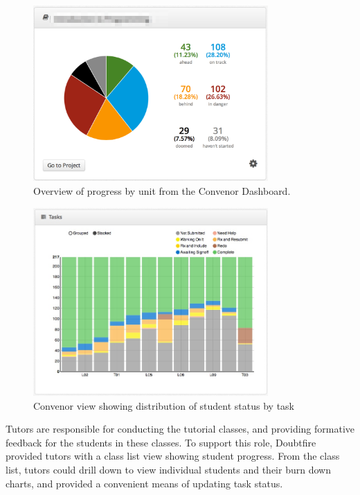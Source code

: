 \begin{figure}[thbp]
  \centering
  \includegraphics[width=0.8\textwidth]{Dashboard}%
  \caption{Overview of progress by unit from the Convenor Dashboard.}%
  \label{fig:dashboard}%
\end{figure}

\begin{figure}[thbp]
  \centering
  \includegraphics[width=0.8\textwidth]{TaskChart}%
  \caption{Convenor view showing distribution of student status by task}%
  \label{fig:task_chart_view}%
\end{figure}

Tutors are responsible for conducting the tutorial classes, and providing formative feedback for the students in these classes. To support this role, Doubtfire provided tutors with a class list view showing student progress. From the class list, tutors could drill down to view individual students and their burn down charts, and provided a convenient means of updating task status. 

